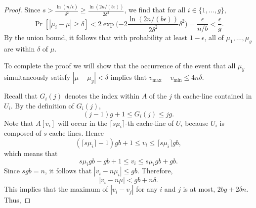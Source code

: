 \documentclass[11pt]{article}
\theoremstyle{remark}
\theoremstyle{remark}
\begin{document}
\begin{proof}
Since $s > \frac{\ln (n/\epsilon)}{\delta^2} \ge \frac{\ln (2n /
  (b\epsilon))}{2\delta^2}$, we find that for all $i \in
  \{1,\ldots, g\}$, $$\Pr[|\mu_i - \mu| \geq \delta] <
  2\exp\Big({-2} \frac{\ln (2n/(b\epsilon))}{2\delta^2}
  \delta^2\Big) = \frac{\epsilon}{n/b} < \frac{\epsilon}{g}. $$
  By the union bound, it follows that with probability at least
  $1 - \epsilon$, all of $\mu_1, \ldots, \mu_{g}$ are within
  $\delta$ of $\mu$.


To complete the proof we will show that the occurrence of the event
that all $\mu_y$ simultaneously satisfy $|\mu - \mu_y| < \delta$ implies
that $v_{\text{max}} - v_{\text{min}} \le 4n\delta$.



  Recall that $G_i(j)$ denotes the index within $A$ of the $j$ th
  cache-line contained in $U_i$. By the definition of $G_i(j)$,
  $$(j - 1)g + 1 \le G_i(j) \le jg.$$ Note that $A[v_i]$ will
  occur in the $\lceil s\mu_i \rceil$-th cache-line of $U_i$
  because $U_i$ is composed of $s$ cache lines. Hence $$(\lceil
  s\mu_i \rceil - 1) g b + 1 \le v_i \le \lceil s\mu_i \rceil g
  b,$$ which means that
  $$s\mu_i g b - gb + 1 \le v_i \le s\mu_i g b + gb.$$ Since $sgb = n$, 
  it follows that $|v_i - n \mu_i| \le gb$. Therefore,
  $$|v_i - n \mu| < gb + n\delta.$$
  This implies that the maximum of $|v_i - v_j|$ for
any $i$ and $j$ is at most, $2bg + 2\delta n$. Thus,


\end{proof}
\end{document}
